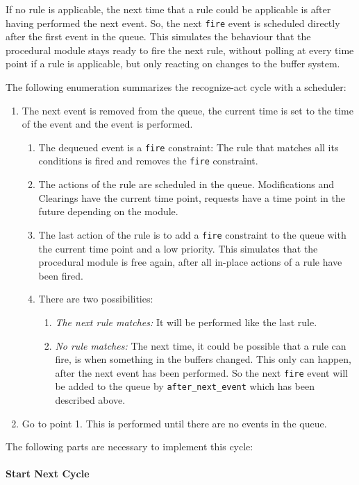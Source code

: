 If no rule is applicable, the next time that a rule could be applicable is after having performed the next event. So, the next \verb|fire| event is scheduled directly after the first event in the queue. This simulates the behaviour that the procedural module stays ready to fire the next rule, without polling at every time point if a rule is applicable, but only reacting on changes to the buffer system. 


The following enumeration summarizes the recognize-act cycle with a scheduler:

\begin{enumerate}
 \item The next event is removed from the queue, the current time is set to the time of the event and the event is performed.
 \begin{enumerate}
 \item The dequeued event is a \verb|fire| constraint: The rule that matches all its conditions is fired and removes the \verb|fire| constraint.
 \item The actions of the rule are scheduled in the queue. Modifications and Clearings have the current time point, requests have a time point in the future depending on the module.
 \item The last action of the rule is to add a \verb|fire| constraint to the queue with the current time point and a low priority. This simulates that the procedural module is free again, after all in-place actions of a rule have been fired.
 \item There are two possibilities:
 \begin{enumerate}
  \item \emph{The next rule matches:} It will be performed like the last rule.
  \item \emph{No rule matches:} The next time, it could be possible that a rule can fire, is when something in the buffers changed. This only can happen, after the next event has been performed. So the next \verb|fire| event will be added to the queue by \verb|after_next_event| which has been described above.
 \end{enumerate}
  \end{enumerate}
 \item Go to point 1. This is performed until there are no events in the queue.
\end{enumerate}


The following parts are necessary to implement this cycle:

\paragraph{Start Next Cycle} 

